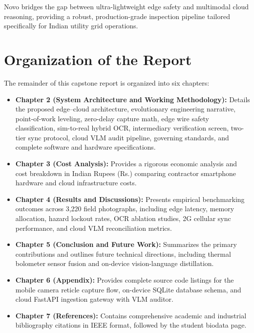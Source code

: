 \documentclass[12pt,a4paper,oneside]{report}
\begin{document}
Novo bridges the gap between ultra-lightweight edge safety and multimodal cloud reasoning, providing a robust, production-grade inspection pipeline tailored specifically for Indian utility grid operations.

\section{Organization of the Report}
The remainder of this capstone report is organized into six chapters:
\begin{itemize}
    \item \textbf{Chapter 2 (System Architecture and Working Methodology):} Details the proposed edge--cloud architecture, evolutionary engineering narrative, point-of-work leveling, zero-delay capture math, edge wire safety classification, sim-to-real hybrid OCR, intermediary verification screen, two-tier sync protocol, cloud VLM audit pipeline, governing standards, and complete software and hardware specifications.
    \item \textbf{Chapter 3 (Cost Analysis):} Provides a rigorous economic analysis and cost breakdown in Indian Rupees (Rs.) comparing contractor smartphone hardware and cloud infrastructure costs.
    \item \textbf{Chapter 4 (Results and Discussions):} Presents empirical benchmarking outcomes across 3,220 field photographs, including edge latency, memory allocation, hazard lockout rates, OCR ablation studies, 2G cellular sync performance, and cloud VLM reconciliation metrics.
    \item \textbf{Chapter 5 (Conclusion and Future Work):} Summarizes the primary contributions and outlines future technical directions, including thermal bolometer sensor fusion and on-device vision-language distillation.
    \item \textbf{Chapter 6 (Appendix):} Provides complete source code listings for the mobile camera reticle capture flow, on-device SQLite database schema, and cloud FastAPI ingestion gateway with VLM auditor.
    \item \textbf{Chapter 7 (References):} Contains comprehensive academic and industrial bibliography citations in IEEE format, followed by the student biodata page.
\end{itemize}

\clearpage

\end{document}
